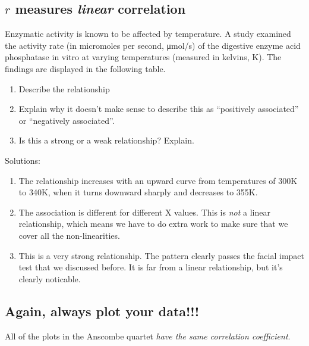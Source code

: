 \documentclass[
  letterpaper,
  DIV=11,
  numbers=noendperiod]{scrreprt}
\providecommand{\tightlist}{%
  \setlength{\itemsep}{0pt}\setlength{\parskip}{0pt}}\usepackage{longtable,booktabs,array}
\begin{document}
\hypertarget{r-measures-linear-correlation}{%
\subsection{\texorpdfstring{\(r\) measures \emph{linear}
correlation}{r measures linear correlation}}\label{r-measures-linear-correlation}}

Enzymatic activity is known to be affected by temperature. A study
examined the activity rate (in micromoles per second, μmol/s) of the
digestive enzyme acid phosphatase in vitro at varying temperatures
(measured in kelvins, K). The findings are displayed in the following
table.

\begin{enumerate}
\def\labelenumi{\alph{enumi}.}
\tightlist
\item
  Describe the relationship
\item
  Explain why it doesn't make sense to describe this as ``positively
  associated'' or ``negatively associated''.
\item
  Is this a strong or a weak relationship? Explain.
\end{enumerate}

Solutions:

\begin{enumerate}
\def\labelenumi{\alph{enumi}.}
\tightlist
\item
  The relationship increases with an upward curve from temperatures of
  300K to 340K, when it turns downward sharply and decreases to 355K.
\item
  The association is different for different X values. This is
  \emph{not} a linear relationship, which means we have to do extra work
  to make sure that we cover all the non-linearities.
\item
  This is a very strong relationship. The pattern clearly passes the
  facial impact test that we discussed before. It is far from a linear
  relationship, but it's clearly noticable.
\end{enumerate}

\hypertarget{again-always-plot-your-data}{%
\subsection{Again, always plot your
data!!!}\label{again-always-plot-your-data}}

\vspace{1cm}

All of the plots in the Anscombe quartet \emph{have the same correlation
coefficient}.
\end{document}
